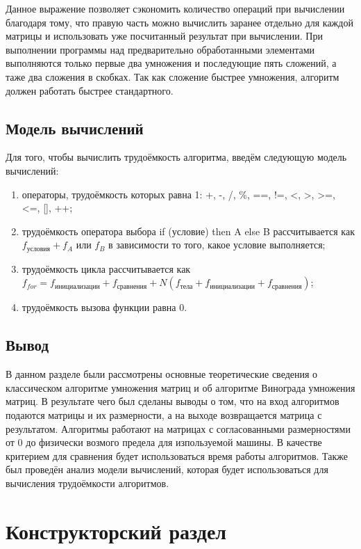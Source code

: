 Данное выражение позволяет сэкономить количество операций при вычислении благодаря тому, что правую часть можно вычислить заранее отдельно для каждой матрицы и использовать уже посчитанный результат при вычислении. При выполнении программы над предварительно обработанными элементами выполняются только первые два умножения и последующие пять сложений, а таже два сложения в скобках. Так как сложение быстрее умножения, алгоритм должен работать быстрее стандартного.

\section{Модель вычислений}
Для того, чтобы вычислить трудоёмкость алгоритма, введём следующую модель вычислений:

\begin{enumerate}
	\item операторы, трудоёмкость которых равна 1: +, -, /, \%, ==, !=, <, >, >=, <=, [], ++;
	\item трудоёмкость оператора выбора if (условие) then A else B рассчитывается как $f_{\text{условия}} + f_{A}$ или $f_{B}$ в зависимости то того, какое условие выполняется;
	\item трудоёмкость цикла рассчитывается как $f_{for} = f_{\text{инициализации}} + f_{\text{сравнения}} + N(f_{\text{тела}} + f_{\text{инициализации}} + f_{\text{сравнения}})$;
	\item трудоёмкость вызова функции равна 0.
\end{enumerate}

\section{Вывод}
В данном разделе были рассмотрены основные теоретические сведения о классическом алгоритме умножения матриц и об алгоритме Винограда умножения матриц. В результате чего был сделаны выводы о том, что на вход алгоритмов подаются матрицы и их размерности, а на выходе возвращается матрица с результатом. Алгоритмы работают на матрицах с согласованными размерностями от 0 до физически возмого предела для изпользуемой машины. В качестве критерием для сравнения будет использоваться время работы алгоритмов. Также был проведён анализ модели вычислений, которая будет использоваться для вычисления трудоёмкости алгоритмов.

\chapter{Конструкторский раздел}

